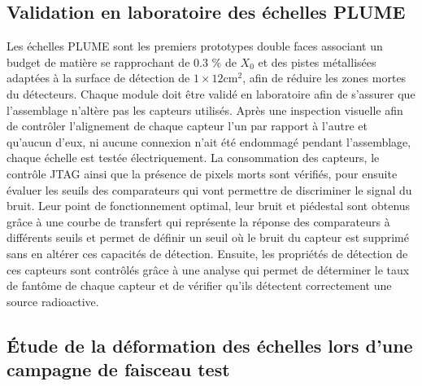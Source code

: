 \documentclass[a4papper, 10pt]{article}
\begin{document}
   \subsection{Validation en laboratoire des échelles PLUME}

  Les échelles PLUME sont les premiers prototypes double faces associant un budget de matière se rapprochant de 0.3 \% de $X_0$ et des pistes métallisées adaptées à la surface de détection de $1 \times 12 \text{cm}^2$, afin de réduire les zones mortes du détecteurs. 
  Chaque module doit être validé en laboratoire afin de s'assurer que l'assemblage n'altère pas les capteurs utilisés.
  Après une inspection visuelle afin de contrôler l'alignement de chaque capteur l'un par rapport à l'autre et qu'aucun d'eux, ni aucune connexion n'ait été endommagé pendant l'assemblage, chaque échelle est testée électriquement.
  La consommation des capteurs, le contrôle JTAG ainsi que la présence de pixels morts sont vérifiés, pour ensuite évaluer les seuils des comparateurs qui vont permettre de discriminer le signal du bruit.
  Leur point de fonctionnement optimal, leur bruit et piédestal sont obtenus grâce à une courbe de transfert qui représente la réponse des comparateurs à différents seuils et permet de définir un seuil où le bruit du capteur est supprimé sans en altérer ces capacités de détection.
  Ensuite, les propriétés de détection de ces capteurs sont contrôlés grâce à une analyse qui permet de déterminer le taux de fantôme de chaque capteur et de vérifier qu'ils détectent correctement une source radioactive.
  
    \subsection{Étude de la déformation des échelles lors d'une campagne de faisceau test}
\end{document}
